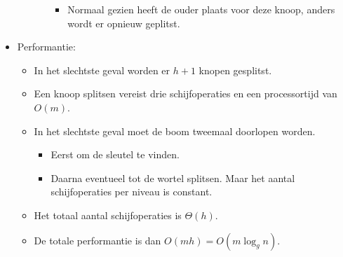 \begin{itemize}
\begin{itemize}
\begin{itemize}
\begin{itemize}
                \item Normaal gezien heeft de ouder plaats voor deze knoop, anders wordt er opnieuw geplitst.
            \end{itemize}
        \end{itemize}
    \end{itemize}
    \item Performantie:
    \begin{itemize}
        \item In het slechtste geval worden er $h + 1$ knopen gesplitst. 
        \item Een knoop splitsen vereist drie schijfoperaties en een processortijd van $O(m)$.
        \item In het slechtste geval moet de boom tweemaal doorlopen worden.
        \begin{itemize}
            \item Eerst om de sleutel te vinden.
            \item Daarna eventueel tot de wortel splitsen.
            \good Maar het aantal schijfoperaties per niveau is constant.
        \end{itemize}
        \item Het totaal aantal schijfoperaties is $\Theta(h)$.
        \item De totale performantie is dan $O(mh) = O(m \log_g n)$.
    \end{itemize}
   
\end{itemize}

